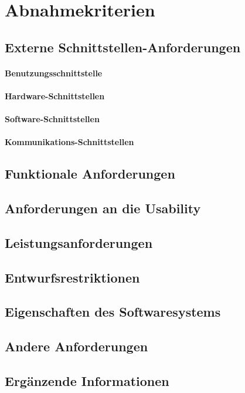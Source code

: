 \section{Abnahmekriterien}


\subsection{Externe Schnittstellen-Anforderungen}

\paragraph{Benutzungsschnittstelle}

\paragraph{Hardware-Schnittstellen}

\paragraph{Software-Schnittstellen}

\paragraph{Kommunikations-Schnittstellen}

\subsection{Funktionale Anforderungen}

\subsection{Anforderungen an die Usability}

\subsection{Leistungsanforderungen}

\subsection{Entwurfsrestriktionen}

\subsection{Eigenschaften des Softwaresystems}

\subsection{Andere Anforderungen}

\subsection{Ergänzende Informationen}